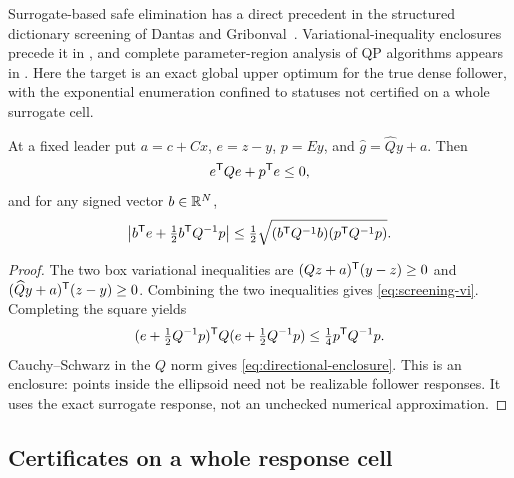 Surrogate-based safe elimination has a direct precedent in the structured
dictionary screening of Dantas and Gribonval~\cite{DantasGribonval2019}.
Variational-inequality enclosures precede it in
\cite{LiuZhaoWangYe2014}, and complete parameter-region analysis of
QP algorithms appears in \cite{ArnstromAxehill2022}. Here the target
is an exact global upper optimum for the true dense follower, with the
exponential enumeration confined to statuses not certified on a whole
surrogate cell.

\begin{lemma}\label{lem:screening-enclosure}
At a fixed leader put $a=c+Cx$, $e=z-y$, $p=Ey$, and
$\widehat g=\widehat Qy+a$. Then
\begin{equation}\label{eq:screening-vi}
                  e^{\mathsf T} Qe+p^{\mathsf T} e\le0,
\end{equation}
and for any signed vector $b\in\mathbb R^N$,
\begin{equation}\label{eq:directional-enclosure}
 \left|b^{\mathsf T} e+\tfrac12b^{\mathsf T} Q^{-1}p\right|
       \le\tfrac12\sqrt{(b^{\mathsf T} Q^{-1}b)(p^{\mathsf T} Q^{-1}p)}.
\end{equation}
\end{lemma}
\begin{proof}
The two box variational inequalities are
$(Qz+a)^{\mathsf T}(y-z)\ge0$ and
$(\widehat Qy+a)^{\mathsf T}(z-y)\ge0$.
Combining the two inequalities gives \eqref{eq:screening-vi}. Completing the square yields
\[
 (e+\tfrac12Q^{-1}p)^{\mathsf T} Q(e+\tfrac12Q^{-1}p)
                         \le\tfrac14p^{\mathsf T} Q^{-1}p.
\]
Cauchy--Schwarz in the $Q$ norm gives
\eqref{eq:directional-enclosure}. This is an enclosure: points inside
the ellipsoid need not be realizable follower responses. It uses the
exact surrogate response, not an unchecked numerical approximation.
\end{proof}

\subsection{Certificates on a whole response cell}\label{subsec:whole-cell-screening}

